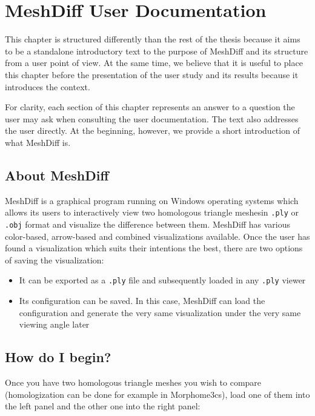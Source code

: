 \chapter{MeshDiff User Documentation}

This chapter is structured differently than the rest of the thesis because it aims to be a standalone introductory text to the purpose of MeshDiff and its structure from a user point of view. At the same time, we believe that it is useful to place this chapter before the presentation of the user study and its results because it introduces the context.

For clarity, each section of this chapter represents an answer to a question the user may ask when consulting the user documentation. The text also addresses the user directly. At the beginning, however, we provide a short introduction of what MeshDiff is.

\section{About MeshDiff}

MeshDiff is a graphical program running on Windows operating systems which allows its users to interactively view two homologous triangle meshes\footnotemark in \verb+.ply+ or \verb+.obj+ format and visualize the difference between them. MeshDiff has various color-based, arrow-based and combined visualizations available. Once the user has found a visualization which suits their intentions the best, there are two options of saving the visualization:

\begin{itemize}
\item It can be exported as a \verb+.ply+ file and subsequently loaded in any \verb+.ply+ viewer
\item Its configuration can be saved. In this case, MeshDiff can load the configuration and generate the very same visualization under the very same viewing angle later
\end{itemize}


\section{How do I begin?}

Once you have two homologous triangle meshes you wish to compare (homologization can be done for example in Morphome3cs), load one of them into the left panel and the other one into the right panel:

